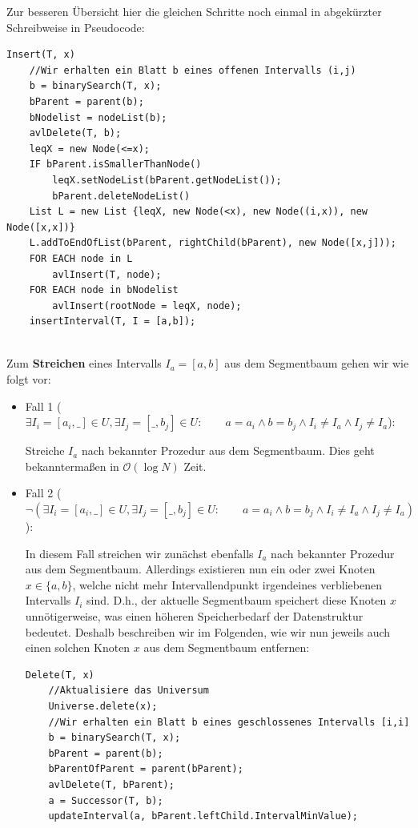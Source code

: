 \documentclass[a4paper]{article}
\begin{document}
\begin{itemize}
\begin{itemize}
\begin{enumerate}
     \end{enumerate}
\end{itemize}

Zur besseren Übersicht hier die gleichen Schritte noch einmal in abgekürzter Schreibweise in
Pseudocode:

\begin{lstlisting}
Insert(T, x)
	//Wir erhalten ein Blatt b eines offenen Intervalls (i,j)
	b = binarySearch(T, x); 
	bParent = parent(b);
	bNodelist = nodeList(b);
	avlDelete(T, b);
	leqX = new Node(<=x);
	IF bParent.isSmallerThanNode()
		leqX.setNodeList(bParent.getNodeList());
		bParent.deleteNodeList()
	List L = new List {leqX, new Node(<x), new Node((i,x)), new Node([x,x])}
	L.addToEndOfList(bParent, rightChild(bParent), new Node([x,j]));
	FOR EACH node in L
		avlInsert(T, node);
	FOR EACH node in bNodelist
		avlInsert(rootNode = leqX, node);
	insertInterval(T, I = [a,b]);
	
\end{lstlisting}

Zum \textbf{Streichen} eines Intervalls $I_a = [a,b]$ aus dem Segmentbaum gehen wir wie folgt vor:

\begin{itemize}
	\item Fall 1 ($\exists I_i = [a_i, \_] \in U, \exists I_j = [\_, b_j] \in U: \qquad a = a_i \wedge b = b_j \wedge I_i \neq I_a \wedge I_j \neq I_a $):
	
	Streiche $I_a$ nach bekannter Prozedur aus dem Segmentbaum. Dies geht bekanntermaßen in 
	$\mathcal{O}(\log N)$ Zeit. 
	\item Fall 2 ($\neg(\exists I_i = [a_i, \_] \in U, \exists I_j = [\_, b_j] \in U: \qquad a = a_i \wedge b = b_j \wedge I_i \neq I_a \wedge I_j \neq I_a )$):
	
	In diesem Fall streichen wir zunächst ebenfalls $I_a$ nach bekannter Prozedur aus dem Segmentbaum.
	Allerdings existieren nun ein oder zwei Knoten $x \in \{a,b\}$, welche nicht mehr Intervallendpunkt
	irgendeines verbliebenen Intervalls $I_i$ sind. D.h., der aktuelle Segmentbaum speichert diese
	Knoten $x$ unnötigerweise, was einen höheren Speicherbedarf der Datenstruktur bedeutet.
	Deshalb beschreiben wir im Folgenden, wie wir nun jeweils auch einen solchen Knoten $x$ aus dem Segmentbaum
	entfernen:
	
\begin{lstlisting}
Delete(T, x)
	//Aktualisiere das Universum
	Universe.delete(x);
	//Wir erhalten ein Blatt b eines geschlossenes Intervalls [i,i]
	b = binarySearch(T, x); 
	bParent = parent(b);
	bParentOfParent = parent(bParent);
	avlDelete(T, bParent);
	a = Successor(T, b);
	updateInterval(a, bParent.leftChild.IntervalMinValue);
	

\end{lstlisting}
\end{itemize}
\end{itemize}
\end{document}
